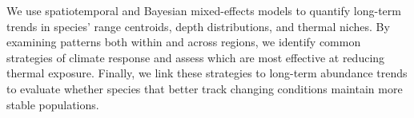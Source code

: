 \documentclass[lineno,pdflatex,sn-nature]{sn-jnl}%
\begin{document}
We use spatiotemporal and Bayesian mixed-effects models to quantify long-term trends in species’ range centroids, depth distributions, and thermal niches. By examining patterns both within and across regions, we identify common strategies of climate response and assess which are most effective at reducing thermal exposure. Finally, we link these strategies to long-term abundance trends to evaluate whether species that better track changing conditions maintain more stable populations.







 
 




\end{document}
